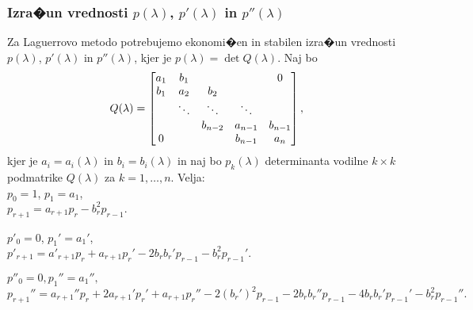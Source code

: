 \documentclass[9pt]{beamer}
\begin{document}
\begin{frame}
\frametitle{Izra�un vrednosti $p(\lambda)$, $p'(\lambda)$ in $p''(\lambda)$}

Za Laguerrovo metodo potrebujemo ekonomi�en in stabilen izra�un
vrednosti $p(\lambda)$, $p'(\lambda)$ in $p''(\lambda)$, kjer je
$p(\lambda)=\det Q(\lambda)$. Naj bo
$$Q(\lambda)=\left[\begin{matrix}a_1 & b_1 &&& 0 \cr
  b_1 & a_2 & b_2 & & \cr
  & \ddots & \ddots & \ddots & \cr
  && b_{n-2} & a_{n-1} & b_{n-1} \cr
  0 &&& b_{n-1} & a_{n}\end{matrix}\right],$$
kjer je $a_i=a_i(\lambda)$ in $b_i=b_i(\lambda)$ in naj bo $p_k(\lambda)$
determinanta vodilne $k\times k$ podmatrike $Q(\lambda)$ za $k=1,\ldots,n$.
Velja:\\[0.5em]

\noindent $p_0=1$, $p_1=a_1$,\\
$p_{r+1}=a_{r+1}p_r-b_r^2p_{r-1}.$\\[0.5em]\pause

\noindent $p'_0=0$, $p_1'=a_1'$, \\
$p'_{r+1}=a'_{r+1}p_r+a_{r+1}p_r'-2b_rb_r'p_{r-1}-b_r^2p_{r-1}'.$\\[0.5em]\pause

\noindent $p''_0=0, p_1''=a_1'',$\\
$p_{r+1}''=a_{r+1}''p_r+2a_{r+1}'p_r'+a_{r+1}p_r''-2(b_r')^2p_{r-1}
-2b_rb_r''p_{r-1}-4b_rb_r'p_{r-1}'-b_r^2p_{r-1}''.$\\

\end{frame}
\end{document}
